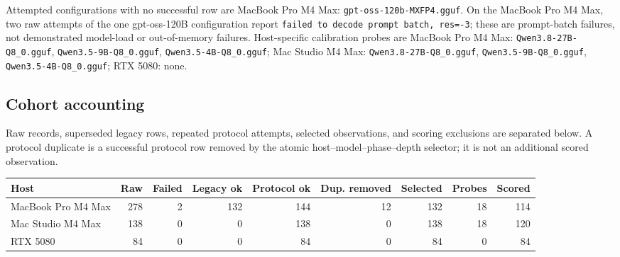 \documentclass[10pt]{article}
\begin{document}
Attempted configurations with no successful row are MacBook Pro M4 Max: \nolinkurl{gpt-oss-120b-MXFP4.gguf}. On the MacBook Pro M4 Max, two raw attempts of the one gpt-oss-120B configuration report \texttt{failed to decode prompt batch, res=-3}; these are prompt-batch failures, not demonstrated model-load or out-of-memory failures. Host-specific calibration probes are MacBook Pro M4 Max: \nolinkurl{Qwen3.8-27B-Q8_0.gguf}, \nolinkurl{Qwen3.5-9B-Q8_0.gguf}, \nolinkurl{Qwen3.5-4B-Q8_0.gguf}; Mac Studio M4 Max: \nolinkurl{Qwen3.8-27B-Q8_0.gguf}, \nolinkurl{Qwen3.5-9B-Q8_0.gguf}, \nolinkurl{Qwen3.5-4B-Q8_0.gguf}; RTX 5080: none.
\subsection{Cohort accounting}
Raw records, superseded legacy rows, repeated protocol attempts, selected observations, and scoring exclusions are separated below. A protocol duplicate is a successful protocol row removed by the atomic host--model--phase--depth selector; it is not an additional scored observation.
\begin{center}
\small
\setlength{\tabcolsep}{2.8pt}
\begin{tabular}{lrrrrrrrr}
\toprule
Host & Raw & Failed & Legacy ok & Protocol ok & Dup. removed & Selected & Probes & Scored\\
\midrule
MacBook Pro M4 Max & 278 & 2 & 132 & 144 & 12 & 132 & 18 & 114 \\
Mac Studio M4 Max & 138 & 0 & 0 & 138 & 0 & 138 & 18 & 120 \\
RTX 5080 & 84 & 0 & 0 & 84 & 0 & 84 & 0 & 84 \\
\bottomrule
\end{tabular}
\end{center}
\end{document}
